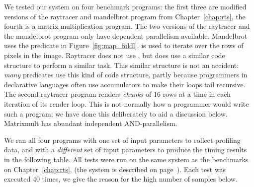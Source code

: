 We tested our system on four benchmark programs:
the first three are modified versions of the raytracer and mandelbrot
program from Chapter~\ref{chap:rts},
the fourth is a matrix multiplication program.
The two versions of the raytracer and the mandelbrot program only have
dependent parallelism available.
Mandelbrot uses the \mapfoldl predicate in Figure~\ref{fig:map_foldl}.
\mapfoldl is used to iterate over the rows of pixels in the image.
Raytracer does not use ,
but does use a similar code structure to perform a similar task.
This similar structure is not an accident:
\emph{many} predicates use this kind of code structure,
partly because programmers in declarative languages
often use accumulators to make their loops tail recursive.
The second raytracer program renders \emph{chunks} of 16 rows at a time in
each iteration of its render loop.
This is not normally how a programmer would write such a program;
we have done this deliberately to aid a discussion below.
Matrixmult has abundant independent AND-parallelism.

We ran all four programs
with one set of input parameters to collect profiling data,
and with a \emph{different} set of input parameters to produce
the timing results in the following table.
All tests were run on the same system as the benchmarks on Chapter~\ref{chap:rts},
(the system is described on page~\pageref{cabsav}).
Each test was executed 40 times,
we give the reason for the high number of samples below.



